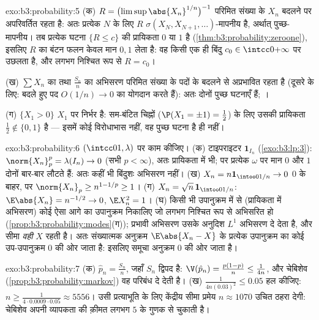 \begin{solution}{exo:b3:probability:5}
(क) $R = \bigl(\limsup\abs{X_n}^{1/n}\bigr)^{-1}$ परिमित
संख्या के $X_n$ बदलने पर अपरिवर्तित रहता है: अतः प्रत्येक $N$
के लिए $R$ $\sigma(X_N, X_{N+1}, \dots)$-मापनीय है, अर्थात्
पुच्छ-मापनीय। तब प्रत्येक घटना $\{R \leq c\}$ की प्रायिकता
$0$ या $1$ है (\cref{thm:b3:probability:zeroone}), इसलिए $R$
का बंटन फलन केवल मान $0, 1$ लेता है: वह किसी एक ही बिंदु $c_0
\in \intcc0{+\infty}$ पर उछलता है, और लगभग निश्चित रूप से
$R = c_0$।

(ख) $\sum X_n$ का तथा $\frac{S_n}n$ का अभिसरण परिमित संख्या
के पदों के बदलने से अप्रभावित रहता है (दूसरे के लिए: बदले हुए
पद $O(1/n) \to 0$ का योगदान करते हैं): अतः दोनों पुच्छ घटनाएँ
हैं; ।

(ग) $\{X_1 > 0\}$ $X_1$ पर निर्भर है:  सम-बंटित
चिह्नों ($\P(X_1 = \pm1) = \frac12$) के लिए उसकी प्रायिकता
$\frac12 \notin \{0,1\}$ है --- इसमें कोई विरोधाभास नहीं, वह
पुच्छ घटना है ही नहीं।
\end{solution}

\begin{solution}{exo:b3:probability:6}
$(\intcc01, \lambda)$ पर काम कीजिए।
(क) टाइपराइटर $\mathbf 1_{I_n}$
(\cref{exo:b3:lp:3}): $\norm{X_n}_p^p = \lambda(I_n) \to 0$
(सभी $p < \infty$), अतः प्रायिकता में भी; पर प्रत्येक $\omega$
पर मान $0$ और $1$ दोनों बार-बार लौटते हैं: अतः कहीं भी
बिंदुशः अभिसरण नहीं।
(ख) $X_n = n\mathbf 1_{\intoo0{1/n}} \to 0$ $0$ के बाहर, पर
$\norm{X_n}_p \geq n^{1 - 1/p} \geq 1$।
(ग) $X_n = \sqrt n\,\mathbf 1_{\intoo0{1/n}}$: $\E\abs{X_n} =
n^{-1/2} \to 0$, $\E X_n^2 = 1$।
(घ) किसी भी उपानुक्रम में से (प्रायिकता में अभिसरण) कोई ऐसा
आगे का उपानुक्रम निकालिए जो लगभग निश्चित रूप से अभिसरित हो
(\cref{prop:b3:probability:modes}(ग)); प्रभावी अभिसरण उसके
अनुदिश $L^1$ अभिसरण दे देता है, और सीमा \emph{वही} $X$ रहती
है। अतः संख्यात्मक अनुक्रम $\E\abs{X_n - X}$ के प्रत्येक
उपानुक्रम का कोई उप-उपानुक्रम $0$ की ओर जाता है: इसलिए समूचा
अनुक्रम $0$ की ओर जाता है।
\end{solution}

\begin{solution}{exo:b3:probability:7}
(क) $\hat p_n = \frac{S_n}n$, जहाँ $S_n$ द्विपद है: $\V(\hat
p_n) = \frac{p(1-p)}n \leq \frac1{4n}$, और चेबिशेव
(\cref{prop:b3:probability:markov}) वह परिबंध दे देती है।
(ख) $\frac1{4n(0.03)^2} \leq 0.05$ हल कीजिए: $n \geq
\frac{1}{4\cdot0.0009\cdot0.05} \approx 5556$। उसी
प्रत्याभूति के लिए केंद्रीय सीमा प्रमेय $n \approx 1070$
उचित ठहरा देगी: चेबिशेव अपनी व्यापकता की क़ीमत लगभग $5$ के
गुणक से चुकाती है।
\end{solution}

